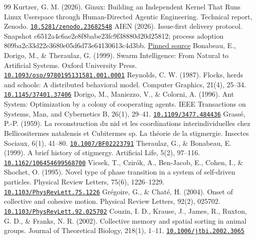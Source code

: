 \documentclass[11pt]{article}
\begin{document}
\begin{thebibliography}{99}
 Kurtzer, G. M. (2026). Ginux: Building an Independent Kernel That Runs Linux Userspace through Human-Directed Agentic Engineering. Technical report, Zenodo. \href{https://doi.org/10.5281/zenodo.23682548}{\nolinkurl{10.5281/zenodo.23682548}}
 AIEN (2026). Issue-first delivery protocol. Snapshot c6512a4c6ae2e8f8babe23fc9f38880d20d25812; process adoption 809ba2c33d22e3680e05d6d73e64130613c4d3bb. \href{https://github.com/aien-dev/aien-architecture-mv/blob/c6512a4c6ae2e8f8babe23fc9f38880d20d25812/docs/process/ISSUE_FIRST_DELIVERY.md}{Pinned source}
 Bonabeau, E., Dorigo, M., \& Theraulaz, G. (1999). Swarm Intelligence: From Natural to Artificial Systems. Oxford University Press. \href{https://doi.org/10.1093/oso/9780195131581.001.0001}{\nolinkurl{10.1093/oso/9780195131581.001.0001}}
 Reynolds, C. W. (1987). Flocks, herds and schools: A distributed behavioral model. Computer Graphics, 21(4), 25--34. \href{https://doi.org/10.1145/37401.37406}{\nolinkurl{10.1145/37401.37406}}
 Dorigo, M., Maniezzo, V., \& Colorni, A. (1996). Ant System: Optimization by a colony of cooperating agents. IEEE Transactions on Systems, Man, and Cybernetics B, 26(1), 29--41. \href{https://doi.org/10.1109/3477.484436}{\nolinkurl{10.1109/3477.484436}}
 Grassé, P.-P. (1959). La reconstruction du nid et les coordinations interindividuelles chez Bellicositermes natalensis et Cubitermes sp. La théorie de la stigmergie. Insectes Sociaux, 6(1), 41--80. \href{https://doi.org/10.1007/BF02223791}{\nolinkurl{10.1007/BF02223791}}
 Theraulaz, G., \& Bonabeau, E. (1999). A brief history of stigmergy. Artificial Life, 5(2), 97--116. \href{https://doi.org/10.1162/106454699568700}{\nolinkurl{10.1162/106454699568700}}
 Vicsek, T., Czirók, A., Ben-Jacob, E., Cohen, I., \& Shochet, O. (1995). Novel type of phase transition in a system of self-driven particles. Physical Review Letters, 75(6), 1226--1229. \href{https://doi.org/10.1103/PhysRevLett.75.1226}{\nolinkurl{10.1103/PhysRevLett.75.1226}}
 Grégoire, G., \& Chaté, H. (2004). Onset of collective and cohesive motion. Physical Review Letters, 92(2), 025702. \href{https://doi.org/10.1103/PhysRevLett.92.025702}{\nolinkurl{10.1103/PhysRevLett.92.025702}}
 Couzin, I. D., Krause, J., James, R., Ruxton, G. D., \& Franks, N. R. (2002). Collective memory and spatial sorting in animal groups. Journal of Theoretical Biology, 218(1), 1--11. \href{https://doi.org/10.1006/jtbi.2002.3065}{\nolinkurl{10.1006/jtbi.2002.3065}}

\end{thebibliography}
\end{document}
